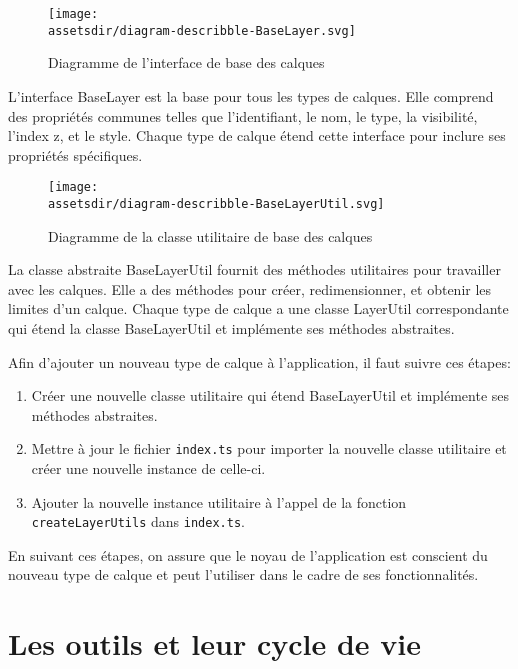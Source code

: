 \begin{figure}[ht]
    \centering
    \texttt{[image: \\assetsdir/diagram-describble-BaseLayer.svg]}
    \caption{Diagramme de l'interface de base des calques}
    \label{fig:baseLayerDiagram}
\end{figure}

L'interface BaseLayer est la base pour tous les types de calques. Elle comprend des propriétés communes telles que l'identifiant, le nom, le type, la visibilité, l'index z, et le style. Chaque type de calque étend cette interface pour inclure ses propriétés spécifiques.

\begin{figure}[ht]
    \centering
    \texttt{[image: \\assetsdir/diagram-describble-BaseLayerUtil.svg]}
    \caption{Diagramme de la classe utilitaire de base des calques}
    \label{fig:baseLayerUtilDiagram}
\end{figure}

La classe abstraite BaseLayerUtil fournit des méthodes utilitaires pour travailler avec les calques. Elle a des méthodes pour créer, redimensionner, et obtenir les limites d'un calque. Chaque type de calque a une classe LayerUtil correspondante qui étend la classe BaseLayerUtil et implémente ses méthodes abstraites.

Afin d'ajouter un nouveau type de calque à l'application, il faut suivre ces étapes:

\begin{enumerate}
    \item Créer une nouvelle classe utilitaire qui étend BaseLayerUtil et implémente ses méthodes abstraites.
    \item Mettre à jour le fichier \texttt{index.ts} pour importer la nouvelle classe utilitaire et créer une nouvelle instance de celle-ci.
    \item Ajouter la nouvelle instance utilitaire à l'appel de la fonction \texttt{createLayerUtils} dans \texttt{index.ts}.
\end{enumerate}

En suivant ces étapes, on assure que le noyau de l'application est conscient du nouveau type de calque et peut l'utiliser dans le cadre de ses fonctionnalités.

\section{Les outils et leur cycle de vie}

